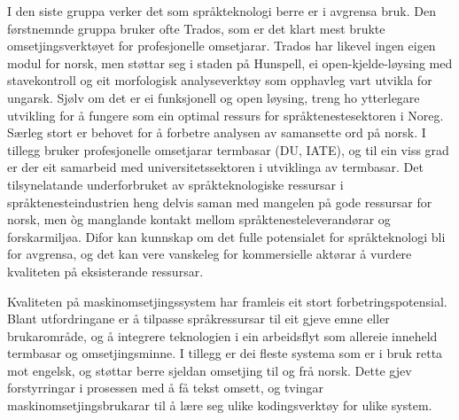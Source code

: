 \begin{multicols}{2}
I den siste gruppa verker det som språkteknologi berre er i avgrensa bruk. Den førstnemnde gruppa bruker ofte Trados, som er det klart mest brukte omsetjingsverktøyet for profesjonelle omsetjarar. Trados har likevel ingen eigen modul for norsk, men støttar seg i staden på Hunspell, ei open-kjelde-løysing med stavekontroll og eit morfologisk analyseverktøy som opphavleg vart utvikla for ungarsk. Sjølv om det er ei funksjonell og open løysing, treng ho ytterlegare utvikling for å fungere som ein optimal ressurs for språktenestesektoren i Noreg. Særleg stort er behovet for å forbetre analysen av samansette ord på norsk. I tillegg bruker profesjonelle omsetjarar termbasar (DU, IATE), og til ein viss grad er der eit samarbeid med universitetssektoren i utviklinga av termbasar. Det tilsynelatande underforbruket av språkteknologiske ressursar i språktenesteindustrien heng delvis saman med mangelen på gode ressursar for norsk, men òg manglande kontakt mellom språktenesteleverandørar og forskarmiljøa. Difor kan kunnskap om det fulle potensialet for språkteknologi bli for avgrensa, og det kan vere vanskeleg for kommersielle aktørar å vurdere kvaliteten på eksisterande ressursar.

Kvaliteten på maskinomsetjingssystem har framleis eit stort forbetringspotensial. Blant utfordringane er å tilpasse språkressursar til eit gjeve emne eller brukarområde, og å integrere teknologien i ein arbeidsflyt som allereie inneheld termbasar og omsetjingsminne. I tillegg er dei fleste systema som er i bruk retta mot engelsk, og støttar berre sjeldan omsetjing til og frå norsk. Dette gjev forstyrringar i prosessen med å få tekst omsett, og tvingar maskinomsetjingsbrukarar til å lære seg ulike kodingsverktøy for ulike system.


\end{multicols}
